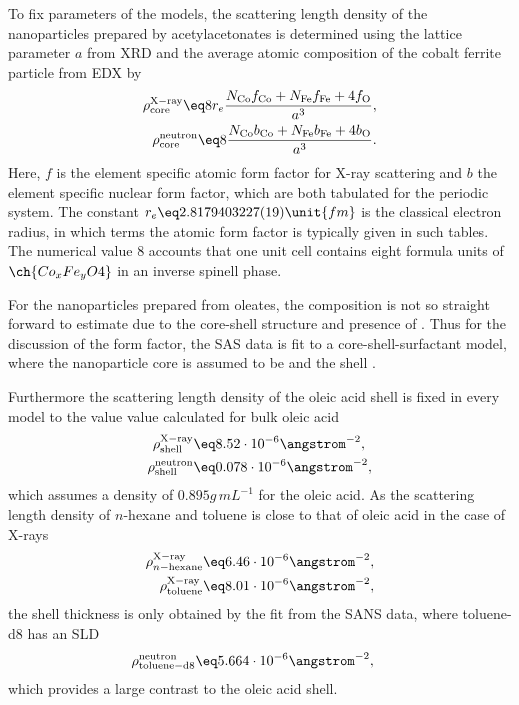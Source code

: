 \documentclass[\main/dresen_thesis.tex]{subfiles}
\begin{document}
    To fix parameters of the models, the scattering length density of the nanoparticles prepared by acetylacetonates is determined using the lattice parameter $a$ from XRD and the average atomic composition of the cobalt ferrite particle from EDX by
    \begin{align}
      \rho^\mathrm{X-ray}_\mathrm{core} \eq 8 r_e \frac{N_\mathrm{Co} f_\mathrm{Co} + N_\mathrm{Fe} f_\mathrm{Fe} + 4 f_\mathrm{O}}{a^3},\\
      \rho^\mathrm{neutron}_\mathrm{core} \eq 8 \frac{N_\mathrm{Co} b_\mathrm{Co} + N_\mathrm{Fe} b_\mathrm{Fe} + 4 b_\mathrm{O}}{a^3}.
    \end{align}
    Here, $f$ is the element specific atomic form factor for X-ray scattering and $b$ the element specific nuclear form factor, which are both tabulated for the periodic system.
    The constant $r_e \eq 2.8179403227(19) \unit{fm}$ is the classical electron radius, in which terms the atomic form factor is typically given in such tables.
    The numerical value $8$ accounts that one unit cell contains eight formula units of $\ch{Co_xFe_yO4}$ in an inverse spinell phase.

    For the nanoparticles prepared from oleates, the composition is not so straight forward to estimate due to the core-shell structure and presence of .
    Thus for the discussion of the form factor, the SAS data is fit to a core-shell-surfactant model, where the nanoparticle core is assumed to be  and the shell .

    Furthermore the scattering length density of the oleic acid shell is fixed in every model to the value value calculated for bulk oleic acid
    \begin{align}
      \rho^\mathrm{X-ray}_\mathrm{shell} &\eq 8.52 \cdot 10^{-6} \angstrom^{-2},\\
      \rho^\mathrm{neutron}_\mathrm{shell} &\eq 0.078 \cdot 10^{-6} \angstrom^{-2},
    \end{align}
    which assumes a density of $0.895 \unit{g\,mL^{-1}}$ for the oleic acid.
    As the scattering length density of $\mathit{n}$-hexane and toluene is close to that of oleic acid in the case of X-rays
    \begin{align}
      \rho^\mathrm{X-ray}_{n\mathrm{-hexane}} &\eq 6.46 \cdot 10^{-6} \angstrom^{-2},\\
      \rho^\mathrm{X-ray}_\mathrm{toluene} &\eq 8.01 \cdot 10^{-6} \angstrom^{-2},
    \end{align}
    the shell thickness is only obtained by the fit from the SANS data, where toluene-d8 has an SLD
    \begin{align}
      \rho^\mathrm{neutron}_\mathrm{toluene-d8} &\eq 5.664 \cdot 10^{-6} \angstrom^{-2},
    \end{align}
    which provides a large contrast to the oleic acid shell.
\end{document}
